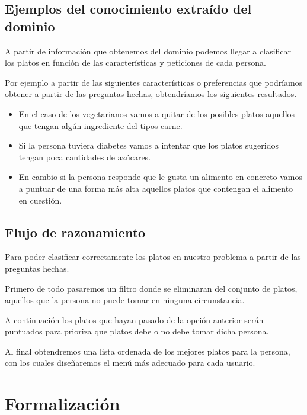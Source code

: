 \documentclass[12]{article}
\begin{document}
\subsection{Ejemplos del conocimiento extraído del dominio}
A partir de información que obtenemos del dominio podemos llegar a clasificar los platos en función de las características y peticiones de cada persona.

Por ejemplo a partir de las siguientes características o preferencias que podríamos obtener a partir de las preguntas hechas, obtendríamos los siguientes resultados.

\begin{itemize}
	\item En el caso de los vegetarianos vamos a quitar de los posibles platos aquellos que tengan algún ingrediente del tipos carne.
	\item Si la persona tuviera diabetes vamos a intentar que los platos sugeridos tengan poca cantidades de azúcares.
	\item En cambio si la persona responde que le gusta un alimento en concreto vamos a puntuar de una forma más alta aquellos platos que contengan el alimento en cuestión.
\end{itemize}

\subsection{Flujo de razonamiento}

Para poder clasificar correctamente los platos en nuestro problema a partir de las preguntas hechas.

Primero de todo pasaremos un filtro donde se eliminaran del conjunto de platos, aquellos que la persona no puede tomar en ninguna circunstancia.

A continuación los platos que hayan pasado de la opción anterior serán puntuados para prioriza que platos debe o no debe tomar dicha persona.

Al final obtendremos una lista ordenada de los mejores platos para la persona, con los cuales diseñaremos el menú más adecuado para cada usuario. 


\section{Formalización}
\end{document}
